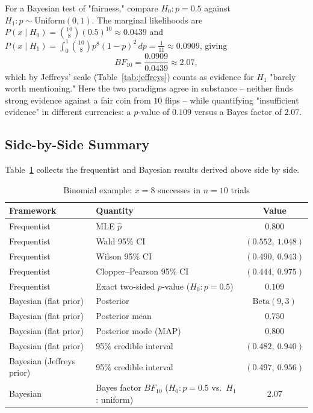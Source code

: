 \documentclass[11pt,a4paper]{article}
\begin{document}
For a Bayesian test of "fairness," compare $H_0: p=0.5$ against $H_1: p \sim \text{Uniform}(0,1)$. The marginal likelihoods are $P(x\mid H_0) = \binom{10}{8}(0.5)^{10} \approx 0.0439$ and $P(x \mid H_1) = \int_0^1 \binom{10}{8}p^{8}(1-p)^{2}\,dp = \tfrac{1}{11} \approx 0.0909$, giving
\begin{equation}
BF_{10} = \frac{0.0909}{0.0439} \approx 2.07,
\end{equation}
which by Jeffreys' scale (Table~\ref{tab:jeffreys}) counts as evidence for $H_1$ "barely worth mentioning." Here the two paradigms agree in substance -- neither finds strong evidence against a fair coin from $10$ flips -- while quantifying "insufficient evidence" in different currencies: a $p$-value of $0.109$ versus a Bayes factor of $2.07$.

\subsection{Side-by-Side Summary}
Table~\ref{tab:worked-example} collects the frequentist and Bayesian results derived above side by side.

\begin{table}[h]
\centering
\caption{Binomial example: $x=8$ successes in $n=10$ trials}
\label{tab:worked-example}
\begin{tabular}{@{}llc@{}}
\toprule
\textbf{Framework} & \textbf{Quantity} & \textbf{Value} \\
\midrule
Frequentist & MLE $\hat p$ & $0.800$ \\
Frequentist & Wald 95\% CI & $(0.552,\ 1.048)$ \\
Frequentist & Wilson 95\% CI & $(0.490,\ 0.943)$ \\
Frequentist & Clopper--Pearson 95\% CI & $(0.444,\ 0.975)$ \\
Frequentist & Exact two-sided $p$-value ($H_0: p=0.5$) & $0.109$ \\
\midrule
Bayesian (flat prior) & Posterior & $\text{Beta}(9,3)$ \\
Bayesian (flat prior) & Posterior mean & $0.750$ \\
Bayesian (flat prior) & Posterior mode (MAP) & $0.800$ \\
Bayesian (flat prior) & 95\% credible interval & $(0.482,\ 0.940)$ \\
Bayesian (Jeffreys prior) & 95\% credible interval & $(0.497,\ 0.956)$ \\
Bayesian & Bayes factor $BF_{10}$ ($H_0: p{=}0.5$ vs.\ $H_1$: uniform) & $2.07$ \\
\bottomrule
\end{tabular}
\end{table}
\end{document}
